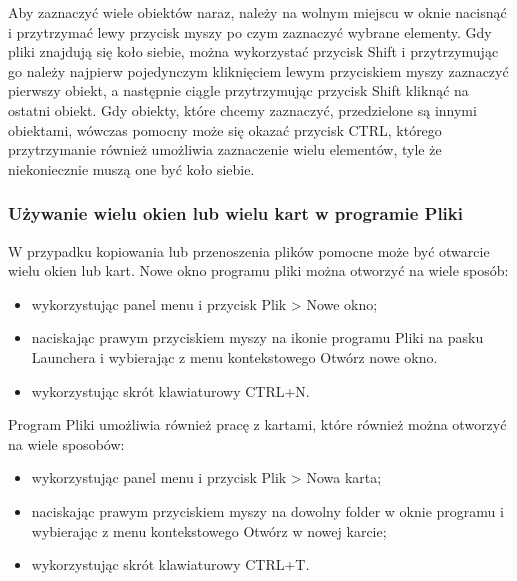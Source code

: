 Aby zaznaczyć wiele obiektów naraz, należy na wolnym miejscu w oknie nacisnąć i przytrzymać lewy przycisk myszy po czym zaznaczyć wybrane elementy. Gdy pliki znajdują się koło siebie, można wykorzystać przycisk Shift i przytrzymując go należy najpierw pojedynczym kliknięciem lewym przyciskiem myszy zaznaczyć pierwszy obiekt, a następnie ciągle przytrzymując przycisk Shift kliknąć na ostatni obiekt. Gdy obiekty, które chcemy zaznaczyć, przedzielone są innymi obiektami, wówczas pomocny może się okazać przycisk CTRL, którego przytrzymanie również umożliwia zaznaczenie wielu elementów, tyle że niekoniecznie muszą one być koło siebie.

\subsubsection{Używanie wielu okien lub wielu kart w programie Pliki}
W przypadku kopiowania lub przenoszenia plików pomocne może być otwarcie wielu okien lub kart. Nowe okno programu pliki można otworzyć na wiele sposób:
\begin{itemize}
\item wykorzystując panel menu i przycisk Plik > Nowe okno;
\item naciskając prawym przyciskiem myszy na ikonie programu Pliki na pasku Launchera i wybierając z menu kontekstowego Otwórz nowe okno.
\item wykorzystując skrót klawiaturowy CTRL+N.
\end{itemize}
Program Pliki umożliwia również pracę z kartami, które również można otworzyć na wiele sposobów:
\begin{itemize}
\item wykorzystując panel menu i przycisk Plik > Nowa karta;
\item naciskając prawym przyciskiem myszy na dowolny folder w oknie programu i wybierając z menu kontekstowego Otwórz w nowej karcie;
\item wykorzystując skrót klawiaturowy CTRL+T.
\end{itemize}

